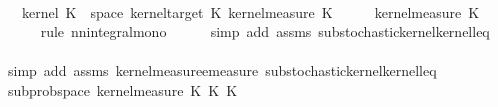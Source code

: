 \begin{isabellebody}
\ \ \isamarkupfalse%
\ \isamarkupfalse%
\ {\isachardoublequoteopen}{\isacharparenleft}{\kern0pt}{\isasymintegral}\isactrlsup {\isacharplus}{\kern0pt}\ {\isasymomega}\ kernel\ K\ {\isasymomega}\ {\isacharparenleft}{\kern0pt}space\ {\isacharparenleft}{\kern0pt}kernel{\isacharunderscore}{\kern0pt}target\ K\ {\isasympartial}kernel{\isacharunderscore}{\kern0pt}measure\ K\ {\isasymomega}{\isacharparenright}{\kern0pt}\ {\isasymle}\ {\isacharparenleft}{\kern0pt}{\isasymintegral}\isactrlsup {\isacharplus}{\kern0pt}\ {\isasymomega}\ {}\ {\isasympartial}kernel{\isacharunderscore}{\kern0pt}measure\ K\ {\isasymomega}{\isacharparenright}{\kern0pt}{\isachardoublequoteclose}\isanewline
\ \ \ \ \isamarkupfalse%
\ {\isacharparenleft}{\kern0pt}rule\ nn{\isacharunderscore}{\kern0pt}integral{\isacharunderscore}{\kern0pt}mono{\isacharparenright}{\kern0pt}\isanewline
\ \ \ \ \isamarkupfalse%
\ {\isacharparenleft}{\kern0pt}simp\ add{\isacharcolon}{\kern0pt}\ assms{\isacharparenleft}{\kern0pt}{}{\isacharparenright}{\kern0pt}\ substochastic{\isacharunderscore}{\kern0pt}kernel{\isachardot}{\kern0pt}kernel{\isacharunderscore}{\kern0pt}leq{\isacharunderscore}{\kern0pt}{}{\isacharparenright}{\kern0pt}\isanewline
\ \ \isamarkupfalse%
\ \isamarkupfalse%
\ {\isachardoublequoteopen}{\isachardot}{\kern0pt}{\isachardot}{\kern0pt}{\isachardot}{\kern0pt}\ {\isasymle}\ {}{\isachardoublequoteclose}\isanewline
\ \ \ \ \isamarkupfalse%
\ {\isacharparenleft}{\kern0pt}simp\ add{\isacharcolon}{\kern0pt}\ assms{\isacharparenleft}{\kern0pt}{}{\isacharparenright}{\kern0pt}\ kernel{\isacharunderscore}{\kern0pt}measure{\isacharunderscore}{\kern0pt}emeasure\ substochastic{\isacharunderscore}{\kern0pt}kernel{\isachardot}{\kern0pt}kernel{\isacharunderscore}{\kern0pt}leq{\isacharunderscore}{\kern0pt}{}{\isacharparenright}{\kern0pt}\isanewline
\ \ \isamarkupfalse%
\ \isamarkupfalse%
\ {\isachardoublequoteopen}subprob{\isacharunderscore}{\kern0pt}space\ {\isacharparenleft}{\kern0pt}kernel{\isacharunderscore}{\kern0pt}measure\ {\isacharparenleft}{\kern0pt}K\ {\isasymcirc}\isactrlsub K\ K\ {\isasymomega}{\isacharparenright}{\kern0pt}{\isachardoublequoteclose}\isanewline

\end{isabellebody}
